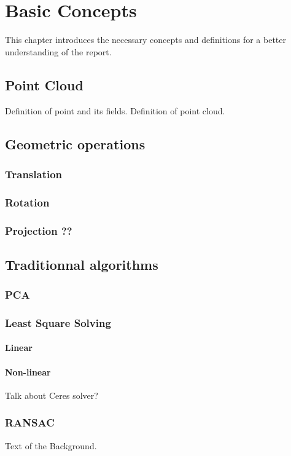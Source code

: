 \chapter{Basic Concepts}
\label{ch:background}

This chapter introduces the necessary concepts and definitions for a better understanding of the report.

\section{Point Cloud}
Definition of point and its fields.
Definition of point cloud.

\section{Geometric operations}
\subsection{Translation}
\subsection{Rotation}
\subsection{Projection ??}

\section{Traditionnal algorithms}

\subsection{PCA}
\subsection{Least Square Solving}
\subsubsection{Linear}
\subsubsection{Non-linear}
Talk about Ceres solver?

\subsection{RANSAC}

Text of the Background.
